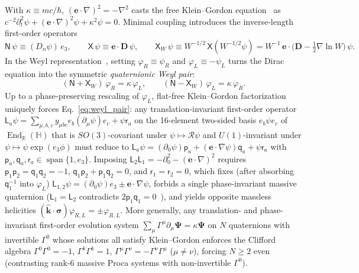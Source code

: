 \documentclass[aps,prd,onecolumn,tightenlines,nofootinbib,notitlepage,10pt,floatfix]{revtex4-2}
\theoremstyle{indentedtheorem}
\begin{document}
With $\kappa\equiv mc/\hbar$, $(\mathbf{e}\cdot\nabla)^2=-\nabla^2$ casts the free Klein--Gordon equation~\citep{Klein1926Quantum,Gordon1926Compton} as $c^{-2}\partial_t^2\psi+(\mathbf{e}\cdot\nabla)^2\psi+\kappa^2\psi=0$. Minimal coupling introduces the inverse-length first-order operators
\begin{equation}
    \mathsf{N}\,\psi \equiv (D_n\psi)\,e_3 , \qquad \mathsf{X}\,\psi \equiv \mathbf{e}\cdot\mathbf{D}\,\psi , \qquad \mathsf{X}_W\,\psi \equiv W^{-1/2}\,\mathsf{X}(W^{-1/2}\psi) = W^{-1}\,\mathbf{e}\cdot\big(\mathbf{D}-\tfrac{1}{2}\nabla\ln W\big)\,\psi .
    \label{eq:NX_operators}
\end{equation}
In the Weyl representation~\citep{Peskin1995Introduction}, setting $\varphi_R\equiv\psi_R$ and $\varphi_L\equiv-\psi_L$ turns the Dirac equation into the symmetric \emph{quaternionic Weyl pair}:
\begin{equation}
    (\mathsf{N}+\mathsf{X}_W)\,\varphi_R = \kappa\,\varphi_L , \qquad (\mathsf{N}-\mathsf{X}_W)\,\varphi_L = \kappa\,\varphi_R .
    \label{eq:weyl_pair}
\end{equation}
Up to a phase-preserving rescaling of $\varphi_L$, flat-free Klein--Gordon factorization uniquely forces Eq.~\eqref{eq:weyl_pair}: any translation-invariant first-order operator $\mathsf{L}_a\psi=\sum_{\mu,b,c}y_{\mu bc}e_b(\partial_\mu\psi)e_c+\psi\mathsf{r}_a$ on the 16-element two-sided basis $e_b\psi e_c$ of $\operatorname{End}_{\mathbb{R}}(\mathbb{H})$ that is $SO(3)$-covariant under $\psi\mapsto\mathcal{R}\psi$ and $U(1)$-invariant under $\psi\mapsto\psi\exp(e_3\phi)$ must reduce to $\mathsf{L}_a\psi=(\partial_0\psi)\mathsf{p}_a+(\mathbf{e}\cdot\nabla\psi)\mathsf{q}_a+\psi\mathsf{r}_a$ with $\mathsf{p}_a,\mathsf{q}_a,\mathsf{r}_a\in\operatorname{span}\{1,e_3\}$. Imposing $\mathsf{L}_2\mathsf{L}_1=-\partial_0^2-(\mathbf{e}\cdot\nabla)^2$ requires $\mathsf{p}_1\mathsf{p}_2=\mathsf{q}_1\mathsf{q}_2=-1$, $\mathsf{q}_1\mathsf{p}_2+\mathsf{p}_1\mathsf{q}_2=0$, and $\mathsf{r}_1=\mathsf{r}_2=0$, which fixes (after absorbing $\mathsf{q}_1^{-1}$ into $\varphi_L$) $\mathsf{L}_{1,2}\psi=(\partial_0\psi)e_3\pm\mathbf{e}\cdot\nabla\psi$, forbids a single phase-invariant massive quaternion ($\mathsf{L}_1=\mathsf{L}_2$ contradicts $2\mathsf{p}_1\mathsf{q}_1=0$~\citep{Pauli1936Contributions}), and yields opposite massless helicities $(\hat{\mathbf{k}}\cdot\boldsymbol{\sigma})\varphi_{R,L}=\pm\varphi_{R,L}$. More generally, any translation- and phase-invariant first-order evolution system $\sum_\mu\Gamma^\mu\partial_\mu\boldsymbol{\Psi}=\kappa\boldsymbol{\Psi}$ on $N$ quaternions with invertible $\Gamma^0$ whose solutions all satisfy Klein--Gordon enforces the Clifford algebra $\Gamma^0\Gamma^0=-1$, $\Gamma^k\Gamma^k=1$, $\Gamma^\mu\Gamma^\nu=-\Gamma^\nu\Gamma^\mu$ ($\mu\neq\nu$), forcing $N\ge 2$ even (contrasting rank-6 massive Proca systems with non-invertible $\Gamma^0$).
\end{document}
